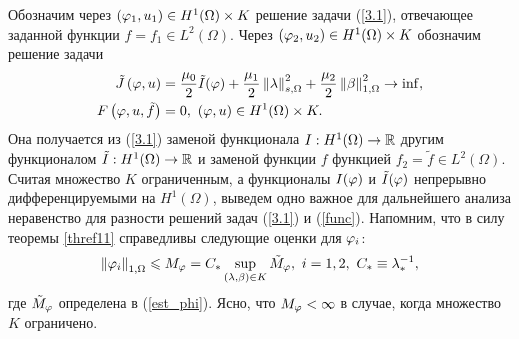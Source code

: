 Обозначим через $(\varphi_1, u_1) \in H^1 (\Omega) \times K$ решение задачи (\ref{3.1}), отвечающее заданной функции $f = f_1 \in L^2 (\Omega)$. Через $(\varphi_2, u_2) \in H^1 (\Omega) \times K$ обозначим решение задачи
\begin{equation}
    \label{func}
    \begin{split}
        \tilde J \left( \varphi, u \right) 
        &= \frac{\mu_0}{2} \tilde I (\varphi) 
        + \frac{\mu_1}{2} \left\Vert \lambda \right\Vert^2_{s,\Omega} 
        + \frac{\mu_2}{2} \left\Vert \beta \right\Vert^2_{1,\Omega} \to \inf, \\
        F \left( \varphi, u, \tilde f \right) &= 0, ~ \left( \varphi, u \right) \in H^1 (\Omega) \times K.
    \end{split}
\end{equation}
Она получается из (\ref{3.1}) заменой функционала $I: H^1(\Omega) \to \mathbb{R}$ другим функционалом $\tilde I: H^1 (\Omega) \to \mathbb{R}$ и заменой функции $f$ функцией $f_2 = \tilde f \in L^2 (\Omega)$. Считая множество $K$ ограниченным, а функционалы $I(\varphi)$ и $\tilde I(\varphi)$ непрерывно дифференцируемыми на $H^1 (\Omega)$, выведем одно важное  для дальнейшего анализа неравенство для разности решений задач (\ref{3.1}) и (\ref{func}). Напомним, что в силу теоремы \ref{thref11} справедливы следующие оценки для $\varphi_i$:
\begin{equation}
    \label{varphii}
    \left\Vert \varphi_i \right\Vert_{1, \Omega} \leqslant M_\varphi = C_{*} \sup_{ \left( \lambda, \beta \right) \in K} \tilde M_\varphi, ~ i={1, 2}, ~ C_{*} \equiv \lambda^{-1}_{*},
\end{equation}
где $\tilde M_\varphi$ определена в (\ref{est_phi}). Ясно, что $M_\varphi < \infty$ в случае, когда множество $K$ ограничено. 

